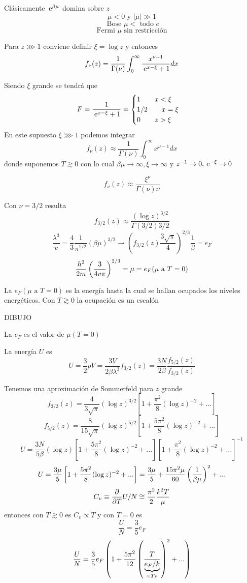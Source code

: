 \documentclass[10pt,oneside]{CBFT_book}
\begin{document}
Clásicamente $\:\mathrm{e}^{\beta\mu}$ domina sobre $z$
\[
	\mu < 0 \text{ y } |\mu| \gg 1 
\]
\[
	\text{ Bose } \mu < \text{ todo } e
\]
\[
	\text{ Fermi } \mu \text{ sin restricción }
\]


Para $ z \ggg 1 $ conviene definir $ \xi = \log z $ y entonces 
\[
	f_\nu(z) = \frac{1}{\Gamma(\nu)} \int_0^\infty \frac{x^{\nu-1}}{\:\mathrm{e}^{x-\xi}+1} dx
\]

Siendo $\xi$ grande se tendrá que 
\[
	F = \frac{ 1 }{ \:\mathrm{e}^{x-\xi} + 1 } = \begin{cases}
	                  1 \qquad x < \xi \\
	                  1/2 \qquad x=\xi \\
	                  0 \qquad z > \xi
	                 \end{cases}
\]
En este supuesto $ \xi \ggg 1 $ podemos integrar
\[
	f_\nu(z) \approx \frac{1}{\Gamma(\nu)} \int_0^\infty x^{\nu-1} dx
\]
donde suponemos $ T \gtrsim 0 $ con lo cual $ \beta\mu \to \infty, \xi \to \infty$ y 
$z^{-1} \to 0, \:\mathrm{e}^{-\xi} \to 0$

\[
	f_\nu(z) \approx \frac{ \xi^\nu }{\Gamma(\nu) \nu}
\]

Con $ \nu = 3/2 $ resulta 
\[
	f_{3/2}(z) \approx \frac{ (\log z)^{3/2} }{\Gamma(3/2) 3/2}
\]
\[
	\frac{\lambda^3}{v} = \frac{4}{3} \frac{1}{\pi^{1/2}}(\beta\mu)^{3/2} \to
	\left( f_{3/2}(z) \frac{3\sqrt{\pi}}{4}\right)^{2/3} \frac{1}{\beta} = e_F
\]
\[
	\frac{h^2}{2m} \left( \frac{ 3 }{ 4v\pi } \right)^{2/3} = \mu = e_F (\mu \text{ a } T=0 )
\]

La $e_F (\mu \text{ a } T=0 )$ es la energía hasta la cual se hallan ocupados los
niveles energéticos. Con $ T \gtrsim 0$ la ocupación es un escalón

DIBUJO 

La $e_F$ es el valor de $\mu (T=0)$

La energía $U$ es 
\[
	U  = \frac{3}{2} p V = \frac{3V}{2\beta\lambda^3} f_{3/2}(z) = \frac{3N}{2\beta} \frac{f_{5/2}(z)}{f_{3/2}(z)}
\]

Tenemos una aproximación de Sommerfeld para $z$ grande 
\[
	f_{3/2}(z) = \frac{ 4 }{ 3\sqrt{\pi} } (\log z)^{3/2} \left[ 1 + \frac{\pi^2}{8}(\log z)^{-2} + ... \right]
\]
\[
	f_{5/2}(z) = \frac{ 8 }{ 15\sqrt{\pi} } (\log z)^{5/2} \left[ 1 + \frac{5\pi^2}{8}(\log z)^{-2} + ... \right]
\]
\[
	U = \frac{ 3N }{ 5\beta } (\log z) 
	\left[ 1 + \frac{5\pi^2}{8}(\log z)^{-2} + ... \right]
	\left[ 1 + \frac{\pi^2}{8}(\log z)^{-2} + ... \right]^{-1}
\]
\[
	U = \frac{3\mu}{5} \left[ 1 + \frac{5\pi^2}{8}(\log z)^{-2} + ... \right] =
	\frac{3\mu}{5} + \frac{15\pi^2\mu}{60} \left( \frac{ 1 }{ \beta\mu } \right)^2 + ...
\]
\[
	C_v \equiv \frac{\partial^{\hspace{-0.05em}} {}}{\partial {T}^{\hspace{-0.05em}}}U/N \cong \frac{\pi^2}{2} \frac{k^2 T}{\mu}
\]
entonces con $T \gtrsim 0$ es $C_v \propto T$ y con $T=0$ es
\[
	\frac{ U}{N} = \frac{3}{5} e_F
\]
\[
	\frac{ U}{N} = \frac{3}{5} e_F \left( 1 + \frac{5\pi^2}{12} 
	\left( \frac{ T }{ \underbrace{e_F/k}_{\equiv T_F} } \right)^2 + ... \right) 
\]
\end{document}
